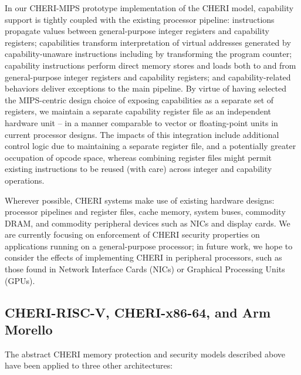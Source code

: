 In our CHERI-MIPS prototype implementation of the CHERI model, capability
support is tightly coupled with the existing processor pipeline: instructions
propagate values between general-purpose integer registers and capability registers; capabilities
transform interpretation of virtual addresses generated by capability-unaware
instructions including by transforming the program counter; capability
instructions perform direct memory stores and loads both to and from
general-purpose integer registers and capability registers; and capability-related behaviors
deliver exceptions to the main pipeline.
By virtue of having selected the MIPS-centric design choice of exposing
capabilities as a separate set of registers, we maintain a separate capability
register file as an independent hardware unit -- in a manner comparable to
vector or floating-point units in current processor designs.
The impacts of this integration include additional control logic due to
maintaining a separate register file, and a potentially greater occupation of
opcode space, whereas
combining register files might permit existing instructions
to be reused (with care) across integer and capability operations.

Wherever possible, CHERI systems make use of existing hardware designs: processor pipelines and register files, cache memory,
system buses, commodity DRAM, and commodity peripheral devices such as
NICs and display cards.
We are currently focusing on enforcement of CHERI security properties on applications
running on a general-purpose processor; in future work, we hope to consider the effects of
implementing CHERI in peripheral processors, such as those found in Network Interface Cards (NICs) or Graphical Processing Units (GPUs).

\subsection{CHERI-RISC-V, CHERI-x86-64, and Arm Morello}

The abstract CHERI memory protection and security models described above have
been applied to three other architectures:

